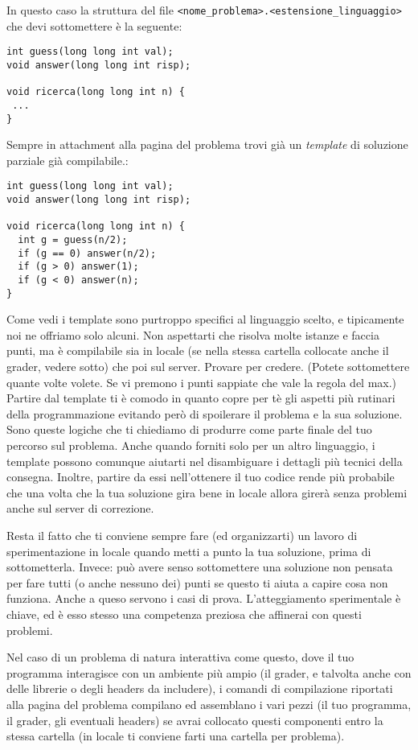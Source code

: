 \documentclass[a4paper,11pt]{article}
\begin{document}
    In questo caso la struttura del file \texttt{<nome\_problema>.<estensione\_linguaggio>} che devi sottomettere \`e la seguente:

\begin{verbatim}
int guess(long long int val);
void answer(long long int risp);

void ricerca(long long int n) {
 ...
}
\end{verbatim}
  
Sempre in attachment alla pagina del problema trovi già un \emph{template} di soluzione parziale già compilabile.:

\begin{verbatim}
int guess(long long int val);
void answer(long long int risp);

void ricerca(long long int n) {
  int g = guess(n/2);
  if (g == 0) answer(n/2);
  if (g > 0) answer(1);
  if (g < 0) answer(n);
}
\end{verbatim}

Come vedi i template sono purtroppo specifici al linguaggio scelto, e tipicamente noi ne offriamo solo alcuni. Non aspettarti che risolva molte istanze e faccia punti, ma \`e compilabile sia in locale (se nella stessa cartella collocate anche il grader, vedere sotto) che poi sul server. Provare per credere. (Potete sottomettere quante volte volete. Se vi premono i punti sappiate che vale la regola del max.)
Partire dal template ti è comodo in quanto copre per tè gli aspetti più rutinari della programmazione evitando però di spoilerare il problema e la sua soluzione. Sono queste logiche che ti chiediamo di produrre come parte finale del tuo percorso sul problema. Anche quando forniti solo per un altro linguaggio, i template possono comunque aiutarti nel disambiguare i dettagli più tecnici della consegna. Inoltre, partire da essi nell'ottenere il tuo codice rende più probabile che una volta che la tua soluzione gira bene in locale allora girerà senza problemi anche sul server di correzione.

Resta il fatto che ti conviene sempre fare (ed organizzarti) un lavoro di sperimentazione in locale quando metti a punto la tua soluzione, prima di sottometterla. Invece: può avere senso sottomettere una soluzione non pensata per fare tutti (o anche nessuno dei) punti se questo ti aiuta a capire cosa non funziona. Anche a queso servono i casi di prova. L'atteggiamento sperimentale è chiave, ed è esso stesso una competenza preziosa che affinerai con questi problemi. 

  Nel caso di un problema di natura interattiva come questo, dove il tuo programma interagisce
  con un ambiente pi\`u ampio (il grader, e talvolta anche con delle librerie o degli headers da includere), i comandi di compilazione riportati alla pagina del problema compilano ed assemblano i vari pezzi (il tuo programma, il grader, gli eventuali headers) se avrai collocato questi componenti entro la stessa cartella (in locale ti conviene farti una cartella per problema).
  
\end{document}
